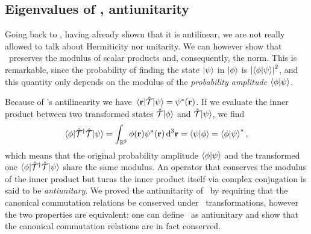         \subsection{Eigenvalues of \hT, antiunitarity}
            Going back to \hT, having already shown that it is antilinear, we are not really allowed to talk about Hermiticity nor unitarity. We can however show that \hT\ preserves the modulus of scalar products and, consequently, the norm. This is remarkable, since the probability of finding the state $\ket{\psi}$ in $\ket{\phi}$ is $\abs{\braket{\phi}{\psi}}^2$, and this quantity only depends on the modulus of the \emph{probability amplitude} $\braket{\phi}{\psi}$.
            
            Because of \hT's antilinearity we have $\mel{\vb{r}}{\hT}{\psi} = \psi^*\pqty{\vb{r}}$. If we evaluate the inner product between two transformed states $\mathcal{\hat{T}}\!\ket{\phi}$ and $\mathcal{\hat{T}}\!\ket{\psi}$, we find
            \begin{equation*}
                \bra{\phi}\!\hT^\dag\hT\!\ket{\psi}
                = \int\nolimits_{\bbR^3} \phi\pqty{\vb{r}}\psi^*\pqty{\vb{r}}\dd[3]{\vb{r}}
                = \bra{\psi}\ket{\phi}
                = \bra{\phi}\ket{\psi}^*
                \mycomma
            \end{equation*}
            which means that the original probability amplitude $\braket{\phi}{\psi}$ and the transformed one $\bra{\phi}\!\mathcal{\hat{T}}^\dag\mathcal{\hat{T}}\!\ket{\psi}$ share the same modulus. An operator that conserves the modulus of the inner product but turns the inner product itself via complex conjugation is said to be \emph{antiunitary}. We proved the antiunitarity of \hT\ by requiring that the canonical commutation relations be conserved under 
            \hT\ transformations, however the two properties are equivalent: one can define \hT\ as antiunitary and show that the canonical commutation relations are in fact conserved.
            
